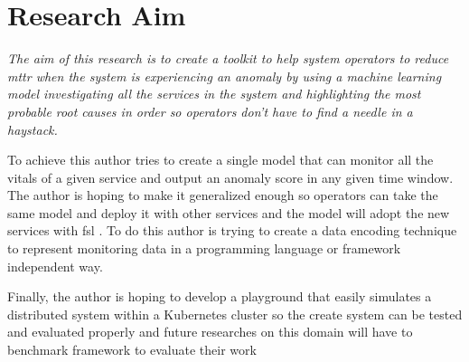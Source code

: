 
{\let\clearpage\relax\chapter{Research Aim}}

\textit{The aim of this research is to create a toolkit to help system operators to reduce \ac{mttr} when the system is experiencing an anomaly by using a machine learning model investigating all the services in the system and highlighting the most probable root causes in order so operators don't have to find a needle in a haystack.}

To achieve this author tries to create a single model that can monitor all the vitals of a given service and output an anomaly score in any given time window. The author is hoping to make it generalized enough so operators can take the same model and deploy it with other services and the model will adopt the new services with \ac{fsl} \citep{wang2020generalizing}. To do this author is trying to create a data encoding technique to represent monitoring data in a programming language or framework independent way.

Finally, the author is hoping to develop a playground that easily simulates a distributed system within a Kubernetes cluster so the create system can be tested and evaluated properly and future researches on this domain will have to benchmark framework to evaluate their work
